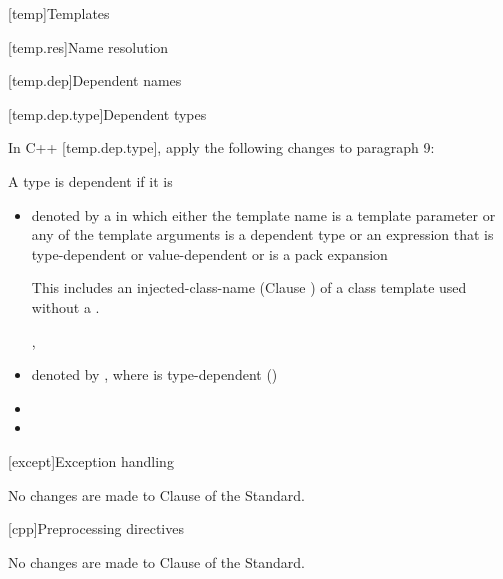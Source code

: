 
[temp]{Templates}

\setcounter{section}{5}
[temp.res]{Name resolution}

\setcounter{subsection}{1}
[temp.dep]{Dependent names}

[temp.dep.type]{Dependent types}

\pnum
In C++ [temp.dep.type], apply the following changes to paragraph 9:

\setcounter{Paras}{9}
\setcounter{Bullets1}{7}

\begin{std.txt}

A type is dependent if it is \newline
[...]

\begin{itemize}
  \item denoted by a  in which either the template name is a template parameter or any of
the template arguments is a dependent type or an expression that is type-dependent or value-dependent
or is a pack expansion \begin{note} This includes an injected-class-name (Clause
) of a class template used
without a . \end{note}, 

  \item denoted by \tcode{)}, where
         is type-dependent ()

  \item {}

  \item {}
\end{itemize}
\end{std.txt}

[except]{Exception handling}

No changes are made to Clause \the\value{chapter} of the \Cpp Standard.

[cpp]{Preprocessing directives}

No changes are made to Clause \the\value{chapter} of the \Cpp Standard.
